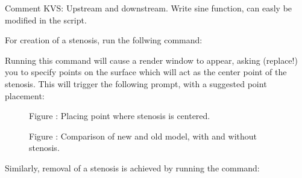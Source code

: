 \documentclass[letterpaper,10pt,english]{sphinxmanual}
\begin{document}
Comment KVS: Upstream and downstream. Write sine function, can easly be modified in the script.

For creation of a stenosis, run the follwing command:

%
\begin{sphinxVerbatim}[commandchars=\\\{\}]
   \PYG{p}{[}\PYG{p}{]}  \PYG{p}{[}\PYG{p}{]}    \PYG{p}{[}\PYG{p}{]}    \PYG{p}{[}\PYG{p}{]}
\end{sphinxVerbatim}

Running this command will cause a render window to appear, asking (replace!) you to specify points on the surface which will act as the center point of the stenosis.
This will trigger the following prompt, with a suggested point placement:

\begin{figure}[htbp]
\centering
\capstart

\noindent{}
\caption{Figure : Placing point where stenosis is centered.}\label{\detokenize{getting_started:id9}}\end{figure}

\begin{figure}[htbp]
\centering
\capstart

\noindent{}
\caption{Figure : Comparison of new and old model, with and without stenosis.}\label{\detokenize{getting_started:id10}}\end{figure}

Similarly, removal of a stenosis is achieved by running the command:

%
\begin{sphinxVerbatim}[commandchars=\\\{\}]
   \PYG{p}{[}\PYG{p}{]}  \PYG{p}{[}\PYG{p}{]}    
\end{sphinxVerbatim}
\end{document}

